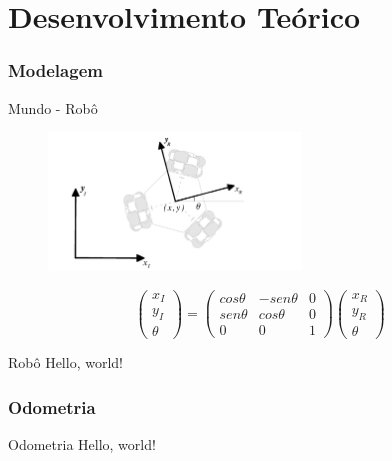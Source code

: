\documentclass{beamer}
\begin{document}
\section{Desenvolvimento Teórico}
\subsubsection{Modelagem}
\begin{frame}{Mundo - Robô}
  \begin{figure}[h]
    \centering
    \includegraphics[width = 0.6\textwidth]{imagens/ref}
  \end{figure}

  \begin{equation}
    \begin{pmatrix}
      x_I \\
      y_I \\
      \theta
    \end{pmatrix}
    =
    \begin{pmatrix}
      cos \theta & -sen \theta & 0 \\
      sen\theta  &  cos \theta & 0 \\
      0          & 0          & 1
    \end{pmatrix}
    \begin{pmatrix}
      x_R \\
      y_R \\
      \theta
    \end{pmatrix}
    \label{eq:world_ref}
  \end{equation}

\end{frame}

\begin{frame}{Robô}
  Hello, world!
\end{frame}
\subsubsection{Odometria}
\begin{frame}{Odometria}
  Hello, world!
\end{frame}
\end{document}
